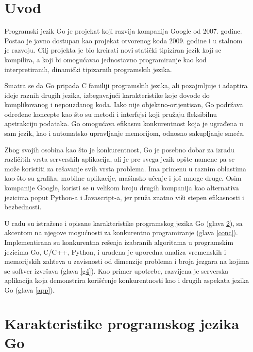 \documentclass[12pt,oneside]{memoir}
\begin{document}
\frontmatter
\naslovna
\komisija
{}
\apstrakt
\tableofcontents*
\mainmatter

\chapter{Uvod}

Programski jezik Go je projekat koji razvija kompanija Google od 2007. godine. Postao je javno dostupan kao projekat otvorenog koda 2009. godine i u stalnom je razvoju. Cilj projekta je bio kreirati novi statički tipiziran jezik koji se kompilira, a koji bi omogućavao jednostavno programiranje kao kod interpretiranih, dinamički tipizarnih programskih jezika. 

Smatra se da Go pripada C familiji programskih jezika, ali pozajmljuje i adaptira ideje raznih drugih jezika, izbegavajući karakteristike koje dovode do komplikovanog i nepouzdanog koda. Iako nije objektno-orijentisan, Go podržava određene koncepte kao što su metodi i interfejsi koji pružaju fleksibilnu apstrakciju podataka. Go omogućava efikasnu konkurentnost koja je ugrađena u sam jezik, kao i automatsko upravljanje memorijom, odnosno sakupljanje smeća. 

Zbog svojih osobina kao što je konkurentnost, Go je posebno dobar za izradu različitih vrsta serverskih aplikacija, ali je pre svega jezik opšte namene pa se može koristiti za rešavanje svih vrsta problema. Ima primenu u raznim oblastima kao što su grafika, mobilne aplikacije, mašinsko učenje i još mnoge druge. Osim kompanije Google, koristi se u velikom broju drugih kompanija kao alternativa jezicima poput Python-a i Javascript-a, jer pruža znatno viši stepen efikasnosti i bezbednosti.

U radu su istražene i opisane karakteristike programskog jezika Go (glava \ref{g2}), sa akcentom na njegove mogućnosti za konkurentno programiranje (glava \ref{conc}). Implementirana su konkurentna rešenja izabranih algoritama u programskim jezicima Go, C/C++, Python, i urađena je uporedna analiza vremenskih i memorijskih zahteva u  zavisnosti od dimenzije problema i broja jezgara na kojima se softver izvršava (glava \ref{g4}). Kao primer upotrebe, razvijena je serverska aplikacija koja demonstrira korišćenje konkurentnosti kao i drugih aspekata jezika Go (glava \ref{app}).


\chapter{Karakteristike programskog jezika Go} \label{g2}
\end{document}
